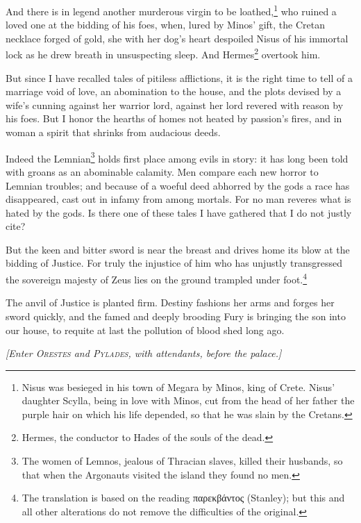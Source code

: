 \documentclass[12pt]{article}
\begin{document}
And there is in legend another murderous virgin to be loathed,\footnote{Nisus was besieged in his town of Megara by Minos, king of Crete. Nisus' daughter Scylla, being in love with Minos, cut from the head of her father the purple hair on which his life depended, so that he was slain by the Cretans.} who ruined a loved one at the bidding of his foes, when, lured by Minos' gift, the Cretan necklace forged of gold, she with her dog's heart despoiled Nisus of his immortal lock as he drew breath in unsuspecting sleep. And Hermes\footnote{Hermes, the conductor to Hades of the souls of the dead.} overtook him.

But since I have recalled tales of pitiless afflictions, it is the right time to tell of a marriage void of love, an abomination to the house, and the plots devised by a wife's cunning against her warrior lord, against her lord revered with reason by his foes. But I honor the hearths of homes not heated by passion's fires, and in woman a spirit that shrinks from audacious deeds.

Indeed the Lemnian\footnote{The women of Lemnos, jealous of Thracian slaves, killed their husbands, so that when the Argonauts visited the island they found no men.} holds first place among evils in story: it has long been told with groans as an abominable calamity. Men compare each new horror to Lemnian troubles; and because of a woeful deed abhorred by the gods a race has disappeared, cast out in infamy from among mortals. For no man reveres what is hated by the gods. Is there one of these tales I have gathered that I do not justly cite?

But the keen and bitter sword is near the breast and drives home its blow at the bidding of Justice. For truly the injustice of him who has unjustly transgressed the sovereign majesty of Zeus lies on the ground trampled under foot.\footnote{The translation is based on the reading παρεκβάντος (Stanley); but this and all other alterations do not remove the difficulties of the original.}

The anvil of Justice is planted firm. Destiny fashions her arms and forges her sword quickly, and the famed and deeply brooding Fury is bringing the son into our house, to requite at last the pollution of blood shed long ago.

\begin{center}
\textit{[Enter \textsc{Orestes} and \textsc{Pylades,} with attendants, before the palace.]}
\end{center}
\end{document}
